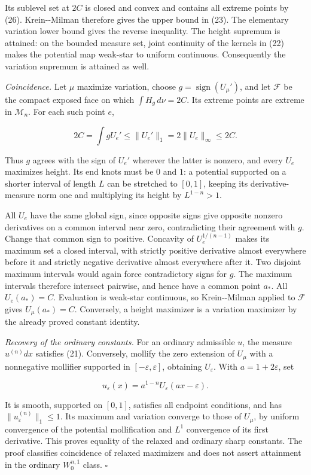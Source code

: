 \documentclass[11pt]{article}
\begin{document}
Its sublevel set at \(2C\) is closed and convex and contains all extreme
points by (26). Krein-\/-Milman therefore gives the upper bound in (23).
The elementary variation lower bound gives the reverse inequality. The
height supremum is attained: on the bounded measure set, joint
continuity of the kernels in (22) makes the potential map weak-star to
uniform continuous. Consequently the variation supremum is attained as
well.

\emph{Coincidence.} Let \(\mu\) maximize variation, choose
\(g=\operatorname{sign}(U_\mu')\), and let \(\mathcal F\) be the compact
exposed face on which \(\int H_g\,d\nu=2C\). Its extreme points are
extreme in \(\mathcal M_n\). For each such point \(e\),

\[
2C=\int gU_e'\le\|U_e'\|_1=2\|U_e\|_\infty\le2C.
\tag{28}
\]

Thus \(g\) agrees with the sign of \(U_e'\) wherever the latter is
nonzero, and every \(U_e\) maximizes height. Its end knots must be \(0\)
and \(1\): a potential supported on a shorter interval of length \(L\)
can be stretched to \([0,1]\), keeping its derivative-measure norm one
and multiplying its height by \(L^{1-n}>1\).

All \(U_e\) have the same global sign, since opposite signs give
opposite nonzero derivatives on a common interval near zero,
contradicting their agreement with \(g\). Change that common sign to
positive. Concavity of \(U_e^{1/(n-1)}\) makes its maximum set a closed
interval, with strictly positive derivative almost everywhere before it
and strictly negative derivative almost everywhere after it. Two
disjoint maximum intervals would again force contradictory signs for
\(g\). The maximum intervals therefore intersect pairwise, and hence
have a common point \(a_*\). All \(U_e(a_*)=C\). Evaluation is weak-star
continuous, so Krein-\/-Milman applied to \(\mathcal F\) gives
\(U_\mu(a_*)=C\). Conversely, a height maximizer is a variation
maximizer by the already proved constant identity.

\emph{Recovery of the ordinary constants.} For an ordinary admissible
\(u\), the measure \(u^{(n)}dx\) satisfies (21). Conversely, mollify the
zero extension of \(U_\mu\) with a nonnegative mollifier supported in
\([-\varepsilon,\varepsilon]\), obtaining \(U_\varepsilon\). With
\(a=1+2\varepsilon\), set

\[
u_\varepsilon(x)=a^{1-n}U_\varepsilon(ax-\varepsilon).
\tag{29}
\]

It is smooth, supported on \([0,1]\), satisfies all endpoint conditions,
and has \(\|u_\varepsilon^{(n)}\|_1\le1\). Its maximum and variation
converge to those of \(U_\mu\), by uniform convergence of the potential
mollification and \(L^1\) convergence of its first derivative. This
proves equality of the relaxed and ordinary sharp constants. The proof
classifies coincidence of relaxed maximizers and does not assert
attainment in the ordinary \(W_0^{n,1}\) class. \(\square\)
\end{document}
